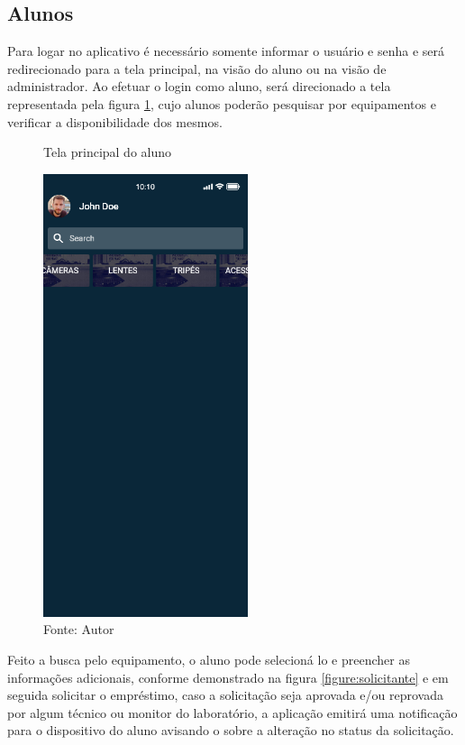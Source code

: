     \clearpage
    
    \subsection{Alunos}
    
    Para logar no aplicativo é necessário somente informar o usuário e senha e será redirecionado para a tela principal, na visão do aluno ou na visão de administrador. Ao efetuar o login como aluno, será direcionado a tela representada pela figura \ref{figure:home-solicitante-screen}, cujo alunos poderão pesquisar por equipamentos e verificar a disponibilidade dos mesmos.
    
    \begin{figure}[h]
    \caption{Tela principal do aluno}
    \centering %
    \includegraphics[width=6cm]{imagem/Home - Solicitante.png}
    \caption*{Fonte: Autor}
    \label{figure:home-solicitante-screen}
    \end{figure}
    
    Feito a busca pelo equipamento, o aluno pode selecioná lo e preencher as informações adicionais, conforme demonstrado na figura \ref{figure:solicitante} e em seguida solicitar o empréstimo, caso a solicitação seja aprovada e/ou reprovada por algum técnico ou monitor do laboratório, a aplicação emitirá uma notificação para o dispositivo do aluno avisando o sobre a alteração no status da solicitação.
    
